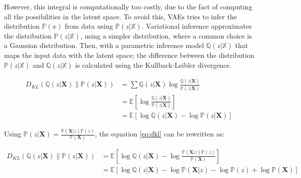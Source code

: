 However, this integral is computationally too costly, due to the fact of computing all the possibilities in the latent space. To avoid this, VAEs tries to infer the distribution \begin{math} \mathbb{P}( x ) \end{math} from data using \begin{math}\mathbb{P}(z|\mathbb{X})\end{math}. Variational inference approximates the distribution \begin{math}\mathbb{P}(z | \mathbb{X})\end{math}, using a simpler distribution, where a common choice is a Gaussian distribution. Then, with a parametric inference model \begin{math}\mathbb{Q}(z|\mathbb{X})\end{math} that maps the input data with the latent space; the difference between the distribution \begin{math}\mathbb{P}(z|\mathbb{X})\end{math} and \begin{math}\mathbb{Q}(z|\mathbb{X})\end{math} is calculated using the Kullback-Leibler divergence.

\begin{equation}
 \begin{aligned} D_{K L}(\mathbb{Q}(z | \mathbf{X}) \| \mathbb{P}(z | \mathbf{X})) &=\sum \mathbb{Q}(z | \mathbf{X}) \log \frac{\mathbb{Q}(z | \mathbf{X})}{\mathbb{P}(z | \mathbf{X})} \\ &=\mathbb{E}\left[\log \frac{\mathbb{Q}(z | \mathbf{X})}{\mathbb{P}(z | \mathbf{X})}\right] \\ &=\mathbb{E}[\log \mathbb{Q}(z | \mathbf{X})-\log \mathbb{P}(z | \mathbf{X})] \end{aligned}
 \label{eq:dkl}
\end{equation}

Using \begin{math}\mathbb{P}(z | \mathbf{X})=\frac{\mathbb{P}(\mathbf{X} | z) \mathbb{P}(z)}{\mathbb{P}(\mathbf{X})}\end{math}, the equation \ref{eq:dkl} can be rewritten as:

\begin{equation}
 \begin{aligned} D_{K L}(\mathbb{Q}(z | \mathbf{X}) \| \mathbb{P}(z | \mathbf{X})) &=\mathbb{E}\left[\log \mathbb{Q}(z | \mathbf{X})-\log \frac{\mathbb{P}(\mathbf{X} | z) \mathbb{P}(z)}{\mathbb{P}(\mathbf{X})}\right] \\ &=\mathbb{E}[\log \mathbb{Q}(z | \mathbf{X})-\log \mathbb{P}(\mathbf{X} | z)-\log \mathbb{P}(z)+\log \mathbb{P}(\mathbf{X})] \end{aligned}
\end{equation}

